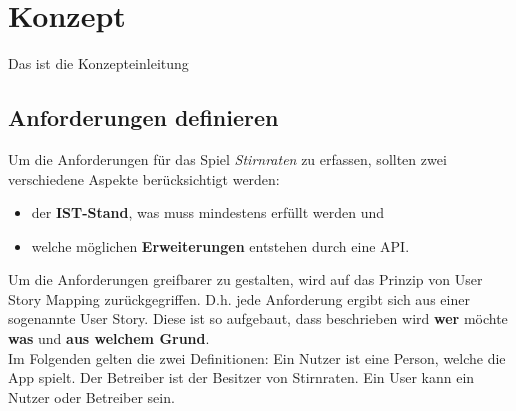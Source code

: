 \section{Konzept}
Das ist die Konzepteinleitung

\subsection{Anforderungen definieren}
Um die Anforderungen für das Spiel \textit{Stirnraten} zu erfassen, sollten zwei verschiedene Aspekte berücksichtigt werden: 

\begin{itemize}
	\item der \textbf{IST-Stand}, was muss mindestens erfüllt werden und 
	\item welche möglichen \textbf{Erweiterungen} entstehen durch eine API.
\end{itemize}

Um die Anforderungen greifbarer zu gestalten, wird auf das Prinzip von User Story Mapping zurückgegriffen. D.h. jede Anforderung ergibt sich aus einer sogenannte User Story. Diese ist so aufgebaut, dass beschrieben wird \textbf{wer} möchte \textbf{was} und \textbf{aus welchem Grund}.\cite{UserStoryMapping}\\

Im Folgenden gelten die zwei Definitionen: Ein Nutzer ist eine Person, welche die App spielt. Der Betreiber ist der Besitzer von Stirnraten. Ein User kann ein Nutzer oder Betreiber sein. \\

